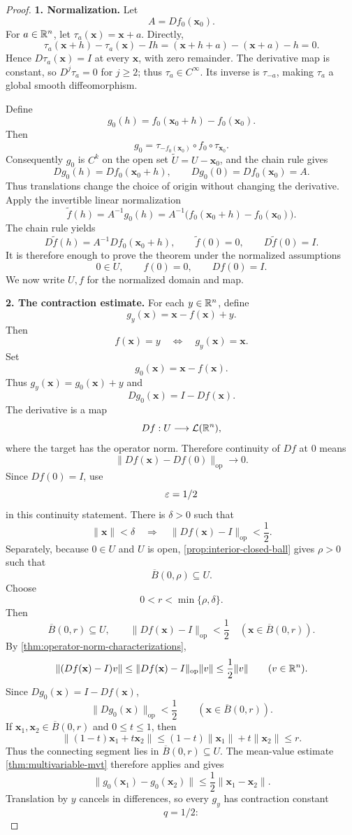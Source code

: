 \begin{proof}
\noindent\textbf{1. Normalization.}
Let
\[
A=Df_0(\mathbf{x}_0).
\]
For $a\in\mathbb{R}^n$, let $\tau_a(\mathbf{x})=\mathbf{x}+a$. Directly,
\[
\tau_a(\mathbf{x}+h)-\tau_a(\mathbf{x})-Ih
=(\mathbf{x}+h+a)-(\mathbf{x}+a)-h=0.
\]
Hence $D\tau_a(\mathbf{x})=I$ at every $\mathbf{x}$, with zero remainder. The derivative map
is constant, so $D^j\tau_a=0$ for $j\geq2$; thus $\tau_a\in C^\infty$.
Its inverse is $\tau_{-a}$, making $\tau_a$ a global smooth diffeomorphism.

Define
\[
g_0(h)=f_0(\mathbf{x}_0+h)-f_0(\mathbf{x}_0).
\]
Then
\[
g_0=\tau_{-f_0(\mathbf{x}_0)}\circ f_0\circ\tau_{\mathbf{x}_0}.
\]
Consequently $g_0$ is $C^k$ on the open set
$\widetilde U=U-\mathbf{x}_0$, and the chain rule gives
\[
Dg_0(h)=Df_0(\mathbf{x}_0+h),
\qquad Dg_0(0)=Df_0(\mathbf{x}_0)=A.
\]
Thus translations change the choice of origin without changing the derivative.
Apply the invertible linear normalization
\[
\widetilde f(h)=A^{-1}g_0(h)
=A^{-1}\bigl(f_0(\mathbf{x}_0+h)-f_0(\mathbf{x}_0)\bigr).
\]
The chain rule yields
\[
D\widetilde f(h)=A^{-1}Df_0(\mathbf{x}_0+h),
\qquad
\widetilde f(0)=0,
\qquad
D\widetilde f(0)=I.
\]
It is therefore enough to prove the theorem under the normalized assumptions
\[
0\in U,
\qquad f(0)=0,
\qquad Df(0)=I.
\]
We now write $U,f$ for the normalized domain and map.

\noindent\textbf{2. The contraction estimate.}
For each $y\in\mathbb{R}^n$, define
\[
g_y(\mathbf{x})=\mathbf{x}-f(\mathbf{x})+y.
\]
Then
\[
f(\mathbf{x})=y\quad\Longleftrightarrow\quad g_y(\mathbf{x})=\mathbf{x}.
\]
Set
\[
g_0(\mathbf{x})=\mathbf{x}-f(\mathbf{x}).
\]
Thus $g_y(\mathbf{x})=g_0(\mathbf{x})+y$ and
\[
Dg_0(\mathbf{x})=I-Df(\mathbf{x}).
\]
The derivative is a map
\[
Df:U\longrightarrow\mathcal L(\mathbb{R}^n),
\]
where the target has the operator norm. Therefore continuity of $Df$ at
$0$ means
\[
\|Df(\mathbf{x})-Df(0)\|_{\mathrm{op}}\longrightarrow0.
\]
Since $Df(0)=I$, use
\[
\varepsilon=1/2
\]
 in this continuity statement. There is
$\delta>0$ such that
\[
\|\mathbf{x}\|<\delta
\quad\Longrightarrow\quad
\|Df(\mathbf{x})-I\|_{\mathrm{op}}<\frac12.
\]
Separately, because $0\in U$ and $U$ is open,
\cref{prop:interior-closed-ball} gives $\rho>0$ such that
\[
\overline B(0,\rho)\subseteq U.
\]
Choose
\[
0<r<\min\{\rho,\delta\}.
\]
Then
\[
\overline B(0,r)\subseteq U,
\qquad
\|Df(\mathbf{x})-I\|_{\mathrm{op}}<\frac12
\quad(\mathbf{x}\in\overline B(0,r)).
\]
By \cref{thm:operator-norm-characterizations},
\[
\|(Df(\mathbf{x})-I)v\|
\leq\|Df(\mathbf{x})-I\|_{\mathrm{op}}\|v\|
\leq\frac12\|v\|
\qquad(v\in\mathbb{R}^n).
\]
Since $Dg_0(\mathbf{x})=I-Df(\mathbf{x})$,
\[
\|Dg_0(\mathbf{x})\|_{\mathrm{op}}<\frac12
\qquad(\mathbf{x}\in\overline B(0,r)).
\]
If $\mathbf{x}_1,\mathbf{x}_2\in\overline B(0,r)$ and $0\leq t\leq1$, then
\[
\|(1-t)\mathbf{x}_1+t\mathbf{x}_2\|
\leq(1-t)\|\mathbf{x}_1\|+t\|\mathbf{x}_2\|
\leq r.
\]
Thus the connecting segment lies in $\overline B(0,r)\subseteq U$. The
mean-value estimate
\cref{thm:multivariable-mvt} therefore applies and gives
\[
\|g_0(\mathbf{x}_1)-g_0(\mathbf{x}_2)\|
\leq\frac12\|\mathbf{x}_1-\mathbf{x}_2\|.
\]
Translation by $y$ cancels in differences, so every $g_y$ has contraction
constant
\[
q=1/2:
\]


\end{proof}

